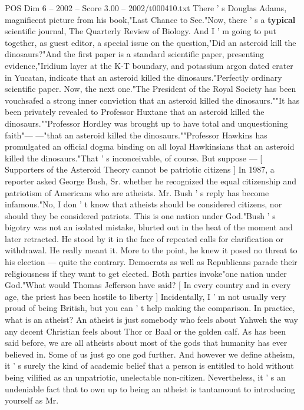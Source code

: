 \begin{textsample}{POS Dim 6 – 2002 – Score 3.00 – 2002/t000410.txt}
There ' s Douglas Adams, magnificent picture from his book,"Last Chance to See."Now, there ' s a \textbf{typical} scientific journal, The Quarterly Review of Biology.
And I ' m going to put together, as guest editor, a special issue on the question,"Did an asteroid kill the dinosaurs?"And the first paper is a standard scientific paper, presenting evidence,"Iridium layer at the K-T boundary, and potassium argon dated crater in Yucatan, indicate that an asteroid killed the dinosaurs."Perfectly ordinary scientific paper.
Now, the next one."The President of the Royal Society has been vouchsafed a strong inner conviction that an asteroid killed the dinosaurs.""It has been privately revealed to Professor Huxtane that an asteroid killed the dinosaurs.""Professor Hordley was brought up to have total and unquestioning faith"— —"that an asteroid killed the dinosaurs.""Professor Hawkins has promulgated an official dogma binding on all loyal Hawkinsians that an asteroid killed the dinosaurs."That ' s inconceivable, of course.
But suppose — [ Supporters of the Asteroid Theory cannot be patriotic citizens ] In 1987, a reporter asked George Bush, Sr. whether he recognized the equal citizenship and patriotism of Americans who are atheists.
Mr.
Bush ' s reply has become infamous."No, I don ' t know that atheists should be considered citizens, nor should they be considered patriots.
This is one nation under God."Bush ' s bigotry was not an isolated mistake, blurted out in the heat of the moment and later retracted.
He stood by it in the face of repeated calls for clarification or withdrawal.
He really meant it.
More to the point, he knew it posed no threat to his election — quite the contrary.
Democrats as well as Republicans parade their religiousness if they want to get elected.
Both parties invoke"one nation under God."What would Thomas Jefferson have said? [ In every country and in every age, the priest has been hostile to liberty ] Incidentally, I ' m not usually very proud of being British, but you can ' t help making the comparison.
In practice, what is an atheist?
An atheist is just somebody who feels about Yahweh the way any decent Christian feels about Thor or Baal or the golden calf.
As has been said before, we are all atheists about most of the gods that humanity has ever believed in.
Some of us just go one god further.
And however we define atheism, it ' s surely the kind of academic belief that a person is entitled to hold without being vilified as an unpatriotic, unelectable non-citizen.
Nevertheless, it ' s an undeniable fact that to own up to being an atheist is tantamount to introducing yourself as Mr.

\end{textsample}
